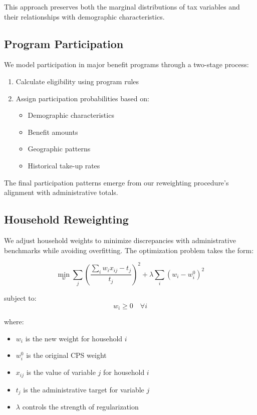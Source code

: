 This approach preserves both the marginal distributions of tax variables and their relationships with demographic characteristics. 

\subsection{Program Participation}

We model participation in major benefit programs through a two-stage process:
\begin{enumerate}
    \item Calculate eligibility using program rules
    \item Assign participation probabilities based on:
        \begin{itemize}
            \item Demographic characteristics
            \item Benefit amounts
            \item Geographic patterns
            \item Historical take-up rates
        \end{itemize}
\end{enumerate}

The final participation patterns emerge from our reweighting procedure's alignment with administrative totals.

\subsection{Household Reweighting}

We adjust household weights to minimize discrepancies with administrative benchmarks while avoiding overfitting. The optimization problem takes the form:

\[ \min_w \sum_j \left(\frac{\sum_i w_i x_{ij} - t_j}{t_j}\right)^2 + \lambda \sum_i (w_i - w_i^0)^2 \]

subject to:
\[ w_i \geq 0 \quad \forall i \]

where:
\begin{itemize}
    \item $w_i$ is the new weight for household $i$
    \item $w_i^0$ is the original CPS weight
    \item $x_{ij}$ is the value of variable $j$ for household $i$
    \item $t_j$ is the administrative target for variable $j$
    \item $\lambda$ controls the strength of regularization
\end{itemize}

